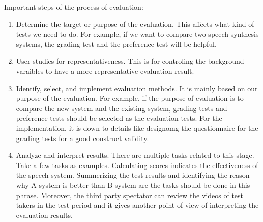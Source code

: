 \documentclass[12pt]{article}
\newenvironment{problem}[2][Problem]{\begin{trivlist}
\item[\hskip \labelsep {\bfseries #1}\hskip \labelsep {\bfseries #2.}]}{\end{trivlist}}
\begin{document}
\begin{problem}{5.1}
    Important steps of the process of evaluation:
    \begin{enumerate}
        \item Determine the target or purpose of the evaluation. This affects what kind
        of tests we need to do. For example, if we want to compare two
        speech synthesis systems, the grading test and the preference test will
        be helpful.

        \item User studies for representativeness. This is for controling the
        background varaibles to have a more representative evaluation
        result.

        \item Identify, select, and implement evaluation methods.
        It is mainly based on our purpose of the evaluation. For example, if the
        purpose of evaluation is to compare the new system and the existing system,
        grading tests and preference tests should be selected as the evaluation
        tests. For the implementation, it is down to details like designomg
        the questionnaire for the grading tests for a good construct validity.

        \item  Analyze and interpret results.
        There are multiple tasks related to this stage. Take a few tasks as examples.
        Calculating scores indicates the effectiveness of the speech system.
        Summerizing the test results and identifying the reason why A system is
        better than B system are the tasks should be done in this phrase. Moreover,
        the third party spectator can review the videos of test takers in 
        the test period and it gives another point of view of interpreting 
        the evaluation results.

    \end{enumerate}
\end{problem}
\end{document}
